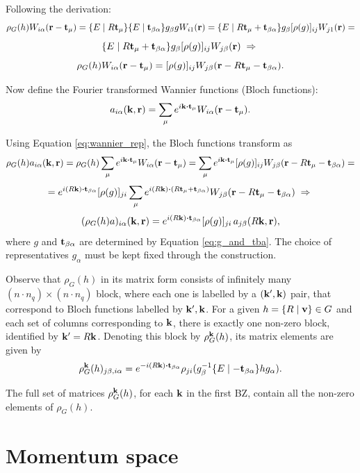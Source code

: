 Following the derivation:
$$
\rho_G(h) W_{i\alpha}({\vb{r}}-{\vb{t}}_\mu) =
\{ E \mid R{\vb{t}}_\mu \} \{ E \mid {\vb{t}}_{\beta\alpha} \} g_\beta g W_{i1}({\vb{r}}) =
\{ E \mid R{\vb{t}}_\mu + {\vb{t}}_{\beta\alpha} \} g_\beta [\rho(g)]_{ij} W_{j1}({\vb{r}}) =
$$
$$
\{ E \mid R{\vb{t}}_\mu + {\vb{t}}_{\beta\alpha} \} g_\beta [\rho(g)]_{ij} W_{j\beta}({\vb{r}}) \; \Rightarrow \;
$$
\begin{equation} \label{eq:wannier_rep}
\rho_G(h) W_{i\alpha}({\vb{r}}-{\vb{t}}_\mu) = [\rho(g)]_{ij} W_{j\beta}({\vb{r}} - R{\vb{t}}_\mu - {\vb{t}}_{\beta\alpha}).
\end{equation}

\n

Now define the Fourier transformed Wannier functions (Bloch functions):
$$
a_{i\alpha}(\k, \r) = \sum_{\mu} e^{i\k\vdot\t_\mu} W_{i\alpha}(\r-\t_\mu).
$$

Using Equation \ref{eq:wannier_rep}, the Bloch functions transform as
$$
\rho_G(h) a_{i\alpha}(\k,\r) =
\rho_G(h) \sum_{\mu} e^{i\k\vdot\t_\mu} W_{i\alpha}(\r-\t_\mu) =
\sum_{\mu} e^{i\k\vdot\t_\mu} [\rho(g)]_{ij} W_{j\beta}(\r-R\t_\mu-\t_{\beta\alpha}) =
$$
$$
= e^{i(R\k)\vdot\t_{\beta\alpha}} [\rho(g)]_{ji} \sum_{\mu} e^{i(R\k)\vdot(R\t_\mu+\t_{\beta\alpha})} W_{j\beta}(\r-R\t_\mu-\t_{\beta\alpha}) \implies
$$
\begin{equation} \label{eq:bloch_rep}
(\rho_G(h) a)_{i\alpha}(\k,\r) = e^{i(R\k)\vdot\t_{\beta\alpha}} [\rho(g)]_{ji} \, a_{j\beta}(R\k, \r),
\end{equation}
where $g$ and ${\vb{t}}_{\beta\alpha}$ are determined by Equation \ref{eq:g_and_tba}. The choice of representatives $g_\alpha$ must be kept fixed through the construction.

Observe that $\rho_G(h)$ in its matrix form consists of infinitely many $(n\cdot n_q)\times (n\cdot n_q)$ block, where each one is labelled by a $({\vb{k}}', {\vb{k}})$ pair, that correspond to Bloch functions labelled by ${\vb{k}}', {\vb{k}}$. For a given $h = \{ R \mid {\vb{v}} \} \in G$ and each set of columns corresponding to ${\vb{k}}$, there is exactly one non-zero block, identified by ${\vb{k}}' = R{\vb{k}}$. Denoting this block by $\rho_G^{\vb{k}}(h)$, its matrix elements are given by
$$
\rho_G^\k(h)_{j\beta,i\alpha} = e^{-i(R\k)\vdot\t_{\beta\alpha}}\rho_{ji}(g_\beta^{-1}\sg{E}{-\t_{\beta\alpha}}hg_\alpha).
$$

The full set of matrices $\rho_G^{\vb{k}}(h)$, for each ${\vb{k}}$ in the first BZ, contain all the non-zero elements of $\rho_G(h)$.

\section{Momentum space}

